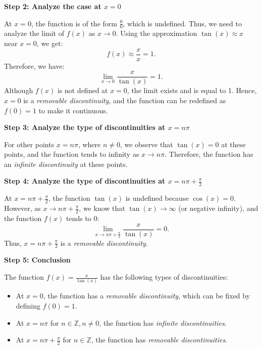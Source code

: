 \documentclass{article}
\begin{document}
\textbf{Step 2: Analyze the case at \( x = 0 \)}

At \( x = 0 \), the function is of the form \( \frac{0}{0} \), which is undefined. Thus, we need to analyze the limit of \( f(x) \) as \( x \to 0 \). Using the approximation \( \tan(x) \approx x \) near \( x = 0 \), we get:
\[
f(x) \approx \frac{x}{x} = 1.
\]
Therefore, we have:
\[
\lim_{x \to 0} \frac{x}{\tan(x)} = 1.
\]
Although \( f(x) \) is not defined at \( x = 0 \), the limit exists and is equal to 1. Hence, \( x = 0 \) is a \textit{removable discontinuity}, and the function can be redefined as \( f(0) = 1 \) to make it continuous.

\textbf{Step 3: Analyze the type of discontinuities at \( x = n\pi \)}

For other points \( x = n\pi \), where \( n \neq 0 \), we observe that \( \tan(x) = 0 \) at these points, and the function tends to infinity as \( x \to n\pi \). Therefore, the function has an \textit{infinite discontinuity} at these points.

\textbf{Step 4: Analyze the type of discontinuities at \( x = n\pi + \frac{\pi}{2} \)}

At \( x = n\pi + \frac{\pi}{2} \), the function \( \tan(x) \) is undefined because \( \cos(x) = 0 \). However, as \( x \to n\pi + \frac{\pi}{2} \), we know that \( \tan(x) \to \infty \) (or negative infinity), and the function \( f(x) \) tends to 0:
\[
\lim_{x \to n\pi + \frac{\pi}{2}} \frac{x}{\tan(x)} = 0.
\]
Thus, \( x = n\pi + \frac{\pi}{2} \) is a \textit{removable discontinuity}.

\textbf{Step 5: Conclusion}

The function \( f(x) = \frac{x}{\tan(x)} \) has the following types of discontinuities:
\begin{itemize}
	\item At \( x = 0 \), the function has a \textit{removable discontinuity}, which can be fixed by defining \( f(0) = 1 \).
	\item At \( x = n\pi \) for \( n \in \mathbb{Z}, n \neq 0 \), the function has \textit{infinite discontinuities}.
	\item At \( x = n\pi + \frac{\pi}{2} \) for \( n \in \mathbb{Z} \), the function has \textit{removable discontinuities}.
\end{itemize}
	\section{}

	\subsection{}
\end{document}
